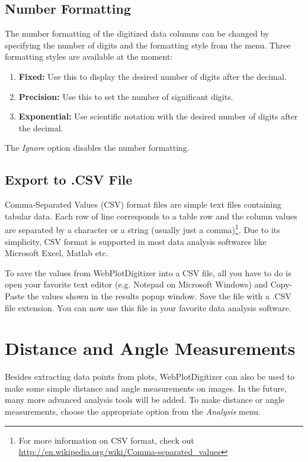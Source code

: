 \documentclass[letterpaper, 10pt]{article}
\begin{document}
\subsection{Number Formatting}
The number formatting of the digitized data columns can be changed by specifying the number of digits and the formatting style from the menu. Three formatting styles are available at the moment: 
\begin{enumerate}
\item{{\bf Fixed:} Use this to display the desired number of digits after the decimal.}
\item{{\bf Precision:} Use this to set the number of significant digits.}
\item{{\bf Exponential: } Use scientific notation with the desired number of digits after the decimal.}
\end{enumerate}
The \emph{Ignore} option disables the number formatting.

\subsection{Export to .CSV File}
Comma-Separated Values (CSV) format files are simple text files containing tabular data. Each row of line corresponds to a table row and the column values are separated by a character or a string (usually just a comma)\footnote{For more information on CSV format, check out \url{http://en.wikipedia.org/wiki/Comma-separated_values}}. Due to its simplicity, CSV format is supported in most data analysis softwares like Microsoft Excel, Matlab etc.

To save the values from WebPlotDigitizer into a CSV file, all you have to do is open your favorite text editor (e.g. Notepad on Microsoft Windows) and Copy-Paste the values shown in the results popup window. Save the file with a .CSV file extension. You can now use this file in your favorite data analysis software.


\section{Distance and Angle Measurements}
Besides extracting data points from plots, WebPlotDigitizer can also be used to make some simple distance and angle measurements on images. In the future, many more advanced analysis tools will be added. To make distance or angle measurements, choose the appropriate option from the \emph{Analysis} menu.
\end{document}
